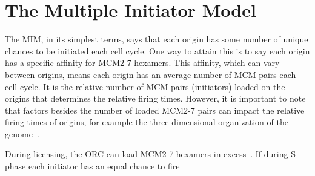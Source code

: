 	
	\section{The Multiple Initiator Model}
	\label{sec:MIM}
	
	The MIM, in its simplest terms, says that each origin has some number of unique chances to be initiated each cell cycle.
	One way to attain this is to say each origin has a specific affinity for MCM2-7 hexamers.
	This affinity, which can vary between origins, means each origin has an average number of MCM pairs each cell cycle.
	It is the relative number of MCM pairs (initiators) loaded on the origins that determines the relative firing times.
	However, it is important to note that factors besides the number of loaded MCM2-7 pairs can impact the relative firing times of origins, for example the three dimensional organization of the genome~\cite{}.~\cite{ScottsThesis}
	
	During licensing, the ORC can load MCM2-7 hexamers in excess~\cite{MultiMCM}.
	If during S phase each initiator has an equal chance to fire










































